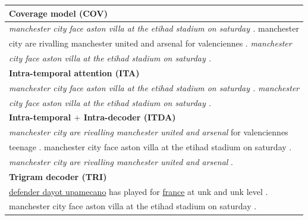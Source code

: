 \begin{table}[th]
\begin{center}
\scriptsize
\begin{tabular}{|l|}%

\hline \bf Coverage model (COV) \\
\hline \textit{manchester city face aston villa at the etihad stadium on saturday .} 
       manchester \\
       city are rivalling manchester united and arsenal for valenciennes . 
	   \textit{ manchester} \\
	   \textit{city face aston villa at the etihad stadium on saturday .}\\
\hline \bf Intra-temporal attention (ITA) \\
\hline \textit{manchester city face aston villa at the etihad stadium on saturday .} 
	   \textit{ manchester} \\
	   \textit{city face aston villa at the etihad stadium on saturday .}\\
\hline \bf Intra-temporal $+$ Intra-decoder (ITDA) \\
\hline \textit{manchester city are rivalling manchester united and arsenal }for valenciennes \\
       teenage . manchester city face aston villa at the etihad stadium on saturday . \\
	   \textit{manchester city are rivalling manchester united and arsenal }. \\
\hline \bf Trigram decoder (TRI) \\
\hline \underline{defender dayot upamecano} has played for \underline{france} 
at unk and unk level .\\ 
       manchester city face aston villa at the etihad stadium on saturday . \\

\end{tabular}
\end{center}
\end{table}
